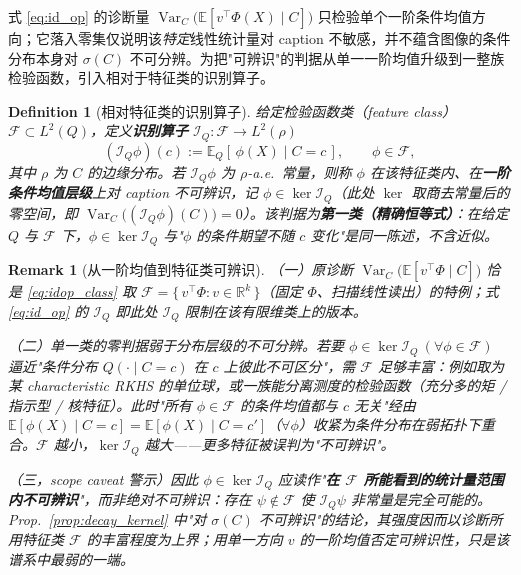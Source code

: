 \documentclass[11pt,a4paper]{article}
\newtheorem{definition}[theorem]{Definition}
\newtheorem{remark}[theorem]{Remark}
\DeclareMathOperator{\Var}{Var}
\newcommand{\E}{\mathbb{E}}
\newcommand{\R}{\mathbb{R}}
\newcommand{\cF}{\mathcal{F}}
\newcommand{\cI}{\mathcal{I}}
\begin{document}

式 \eqref{eq:id_op} 的诊断量 $\Var_C\!\bigl(\E[v^\top\Phi(X)\mid C]\bigr)$ 只检验单个一阶条件均值方向；它落入零集仅说明该\emph{特定}线性统计量对 caption 不敏感，并不蕴含图像的条件分布本身对 $\sigma(C)$ 不可分辨。为把"可辨识"的判据从单一一阶均值升级到一整族检验函数，引入相对于特征类的识别算子。

\begin{definition}[相对特征类的识别算子]\label{def:idop_class}
给定检验函数类（feature class）$\cF\subset L^2(Q)$，定义\textbf{识别算子} $\cI_Q:\cF\to L^2(\rho)$
\begin{equation}\label{eq:idop_class}
(\cI_Q\phi)(c):=\E_Q[\,\phi(X)\mid C=c\,],\qquad \phi\in\cF,
\end{equation}
其中 $\rho$ 为 $C$ 的边缘分布。若 $\cI_Q\phi$ 为 $\rho$-a.e.\ 常量，则称 $\phi$ 在该特征类内、在\textbf{一阶条件均值层级}上对 caption 不可辨识，记 $\phi\in\ker\cI_Q$（此处 $\ker$ 取商去常量后的零空间，即 $\Var_C\bigl((\cI_Q\phi)(C)\bigr)=0$）。该判据为\textbf{第一类（精确恒等式）}：在给定 $Q$ 与 $\cF$ 下，$\phi\in\ker\cI_Q$ 与"$\phi$ 的条件期望不随 $c$ 变化"是同一陈述，不含近似。
\end{definition}

\begin{remark}[从一阶均值到特征类可辨识]\label{rem:ident_class}
（一）原诊断 $\Var_C\!\bigl(\E[v^\top\Phi\mid C]\bigr)$ 恰是 \eqref{eq:idop_class} 取 $\cF=\{\,v^\top\Phi:v\in\R^k\,\}$（固定 $\Phi$、扫描线性读出）的特例；式 \eqref{eq:id_op} 的 $\cI_Q$ 即此处 $\cI_Q$ 限制在该有限维类上的版本。

（二）单一类的零判据弱于分布层级的不可分辨。若要 $\phi\in\ker\cI_Q\ (\forall\phi\in\cF)$ 逼近"条件分布 $Q(\cdot\mid C=c)$ 在 $c$ 上彼此不可区分"，需 $\cF$ 足够丰富：例如取为某 characteristic RKHS 的单位球，或一族能分离测度的检验函数（充分多的矩 / 指示型 / 核特征）。此时"所有 $\phi\in\cF$ 的条件均值都与 $c$ 无关"经由 $\E[\phi(X)\mid C=c]=\E[\phi(X)\mid C=c']$（$\forall\phi$）收紧为条件分布在弱拓扑下重合。$\cF$ 越小，$\ker\cI_Q$ 越大——更多特征被误判为"不可辨识"。

（三，scope caveat 警示）因此 $\phi\in\ker\cI_Q$ 应读作"\textbf{在 $\cF$ 所能看到的统计量范围内不可辨识}"，而非绝对不可辨识：存在 $\psi\notin\cF$ 使 $\cI_Q\psi$ 非常量是完全可能的。Prop.~\ref{prop:decay_kernel} 中"对 $\sigma(C)$ 不可辨识"的结论，其强度因而以诊断所用特征类 $\cF$ 的丰富程度为上界；用单一方向 $v$ 的一阶均值否定可辨识性，只是该谱系中最弱的一端。
\end{remark}
\end{document}
